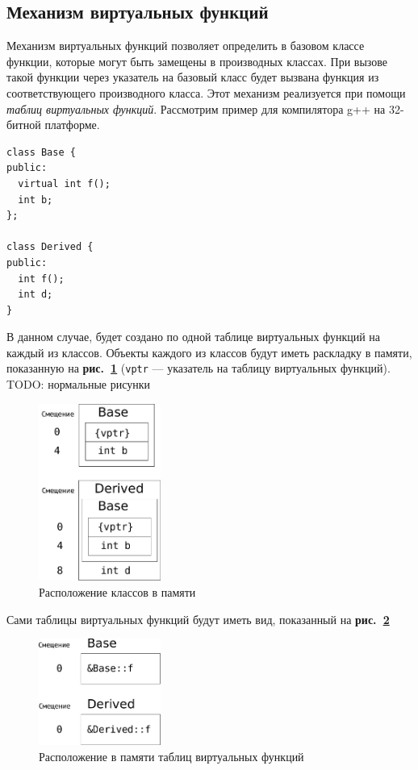\documentclass[a4paper,12pt,russian]{article}
\newcommand{\picref}[1]{\textbf{рис.~\ref{#1}}}
\begin{document}
\subsection{Механизм виртуальных функций}
Механизм виртуальных функций позволяет определить в базовом классе функции, которые могут быть замещены в производных классах.
При вызове такой функции через указатель на базовый класс будет вызвана функция из соответствующего производного класса.
Этот механизм реализуется при помощи \emph{таблиц виртуальных функций}.
Рассмотрим пример для компилятора g++ на 32-битной платформе.
\begin{lstlisting}
class Base {
public:
  virtual int f();
  int b;
};

class Derived {
public:
  int f();
  int d;
}
\end{lstlisting}
В данном случае, будет создано по одной таблице виртуальных функций на каждый из классов.
Объекты каждого из классов будут иметь раскладку в памяти, показанную на \picref{memlayout_fig} (\texttt{vptr} --- указатель на таблицу виртуальных функций).
TODO: нормальные рисунки
\begin{figure}
  \center
  \includegraphics[width=4cm]{simple_mem_layout.pdf}
  \hfill
  \caption{Расположение классов в памяти}
  \label{memlayout_fig}
\end{figure}

Сами таблицы виртуальных функций будут иметь вид, показанный на \picref{simple_vtables_fig}
\begin{figure}
  \center
  \includegraphics[width=4cm]{simple_vtables.pdf}
  \hfill
  \caption{Расположение в памяти таблиц виртуальных функций}
  \label{simple_vtables_fig}
\end{figure}
\end{document}
